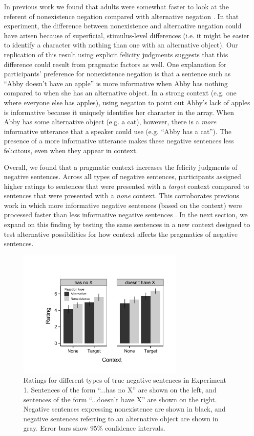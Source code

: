 \documentclass[10pt,letterpaper]{article}
\begin{document}
In previous work we found that adults were somewhat faster to look at the referent of nonexistence negation compared with alternative negation \cite{nordmeyer2014b}. In that experiment, the difference between nonexistence and alternative negation could have arisen because of superficial, stimulus-level differences (i.e. it might be easier to identify a character with nothing than one with an alternative object). Our replication of this result using explicit felicity judgments suggests that this difference could result from pragmatic factors as well. One explanation for participants' preference for nonexistence negation is that a sentence such as ``Abby doesn't have an apple'' is more informative when Abby has nothing compared to when she has an alternative object.  In a strong context (e.g. one where everyone else has apples), using negation to point out Abby's lack of apples is informative because it uniquely identifies her character in the array.  When Abby has some alternative object (e.g. a cat), however, there is a \emph{more} informative utterance that a speaker could use (e.g. ``Abby has a cat'').  The presence of a more informative utterance makes these negative sentences less felicitous, even when they appear in context.

Overall, we found that a pragmatic context increases the felicity judgments of negative sentences.  Across all types of negative sentences, participants assigned higher ratings to sentences that were presented with a \emph{target} context compared to sentences that were presented with a \emph{none} context.  This corroborates previous work in which more informative negative sentences (based on the context) were processed faster than less informative negative sentences \cite{nordmeyer2014}.  In the next section, we expand on this finding by testing the same sentences in a new context designed to test alternative possibilities for how context affects the pragmatics of negative sentences.

\begin{figure}
\begin{center} 
\includegraphics[width=3.25in]{figures/study1.pdf}
\caption{\label{fig:s1} Ratings for different types of true negative sentences in Experiment 1.  Sentences of the form ``...has no X'' are shown on the left, and sentences of the form ``...doesn't have X'' are shown on the right.  Negative sentences expressing nonexistence are shown in black, and negative sentences referring to an alternative object are shown in gray.  Error bars show 95\% confidence intervals.}
\end{center} 
\end{figure}
\end{document}
